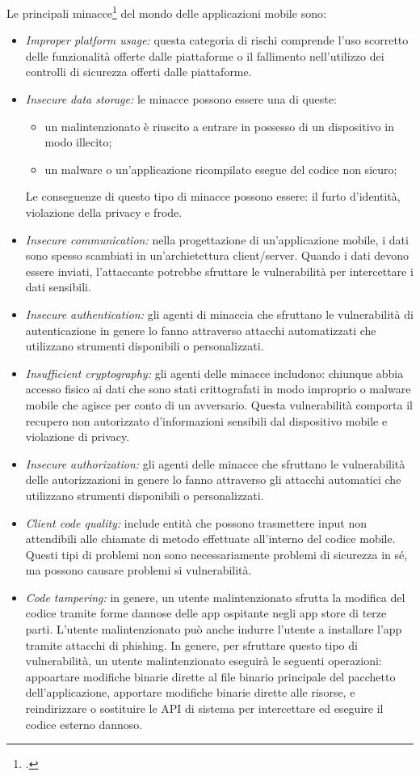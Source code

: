 Le principali minacce\footcite{site:owasp} del mondo delle applicazioni mobile sono:
\begin{itemize}
    \item \textit{Improper platform usage:} questa categoria di rischi comprende l'uso scorretto delle funzionalità offerte dalle piattaforme o il fallimento nell'utilizzo dei controlli di sicurezza offerti dalle piattaforme.
    \item \textit{Insecure data storage:} le minacce possono essere una di queste:
    \begin{itemize}
        \item un malintenzionato è riuscito a entrare in possesso di un dispositivo in modo illecito;
        \item un malware o un'applicazione ricompilato esegue del codice non sicuro;
    \end{itemize}
    Le conseguenze di questo tipo di minacce possono essere: il furto d'identità, violazione della privacy e frode.
    \item \textit{Insecure communication:}
    nella progettazione di un'applicazione mobile, i dati sono spesso scambiati in un'archietettura client/server.
    Quando i dati devono essere inviati, l'attaccante potrebbe sfruttare le vulnerabilità per intercettare i dati sensibili.
    \item \textit{Insecure authentication:}
    gli agenti di minaccia che sfruttano le vulnerabilità di autenticazione in genere lo fanno attraverso attacchi automatizzati che utilizzano strumenti disponibili o personalizzati.
    \item \textit{Insufficient cryptography:} gli agenti delle minacce includono: chiunque abbia accesso fisico ai dati che sono stati crittografati in modo improprio o malware mobile che agisce per conto di un avversario.
    Questa vulnerabilità comporta il recupero non autorizzato d'informazioni sensibili dal dispositivo mobile e violazione di privacy.
    \item \textit{Insecure authorization:}
    gli agenti delle minacce che sfruttano le vulnerabilità delle autorizzazioni in genere lo fanno attraverso gli attacchi automatici che utilizzano strumenti disponibili o personalizzati.
    \item \textit{Client code quality:} include entità che possono trasmettere input non attendibili alle chiamate di metodo effettuate all'interno del codice mobile. Questi tipi di problemi non sono necessariamente problemi di sicurezza in sé, ma possono causare problemi si vulnerabilità.
    \item \textit{Code tampering:}
    in genere, un utente malintenzionato sfrutta la modifica del codice tramite forme dannose delle app ospitante negli app store di terze parti.
    L'utente malintenzionato può anche indurre l'utente a installare l'app tramite attacchi di phishing. In genere, per sfruttare questo tipo di vulnerabilità, un utente malintenzionato eseguirà le seguenti operazioni: appoartare modifiche binarie dirette al file binario principale del pacchetto dell'applicazione, apportare modifiche binarie dirette alle risorse, e reindirizzare o sostituire le API di sistema per intercettare ed eseguire il codice esterno dannoso.


\end{itemize}
